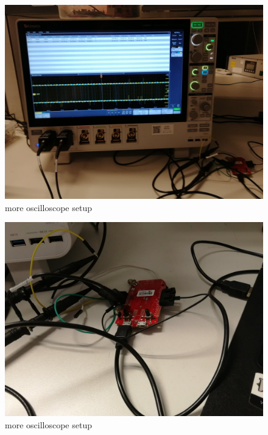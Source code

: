 \documentclass{beamer}
\begin{document}

\begin{frame}

\begin{figure}
\centering
\includegraphics[scale=0.1]{assets/2.jpg}
\caption{more oscilloscope setup}
\end{figure}

\end{frame}


\begin{frame}

\begin{figure}
\centering
\includegraphics[scale=0.1]{assets/3.jpg}
\caption{more oscilloscope setup}
\end{figure}

\end{frame}

\end{document}
